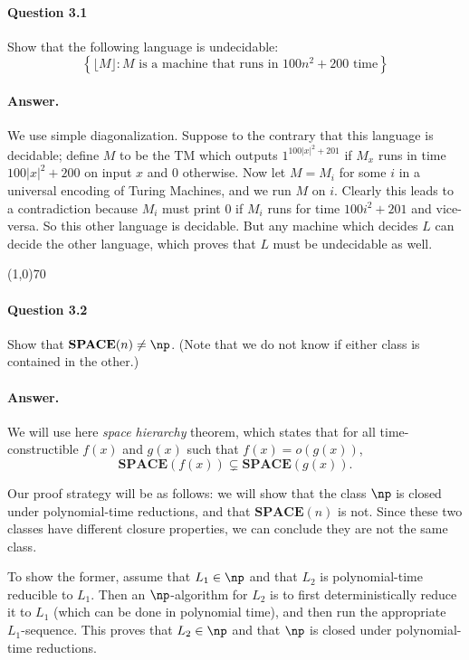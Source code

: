 \paragraph{Question 3.1} Show that the following language is undecidable:
\begin{equation*}
	\left\{\lfloor M\rfloor: M \text{ is a machine that runs in } 100n^2+200 \text{ time}\right\}
\end{equation*}
\paragraph{Answer.} We use simple diagonalization. Suppose to the contrary that this language is decidable; define $M$ to be the TM which outputs $1^{100|x|^2+201}$ if $M_x$ runs in time $100|x|^2+200$ on input $x$ and $0$ otherwise. Now let $M=M_i$ for some $i$ in a universal encoding of Turing Machines, and we run $M$ on $i$. Clearly this leads to a contradiction because $M_i$ must print $0$ if $M_i$ runs for time $100i^2+201$ and vice-versa. So this other language is decidable. But any machine which decides $L$ can decide the other language, which proves that $L$ must be undecidable as well.

\begin{center}
	\line(1,0){70}
\end{center}

\paragraph{Question 3.2} Show that $\mathbf{SPACE}(n)\neq\np$. (Note that we do not know if either class is contained in the other.)

\paragraph{Answer.} We will use here \textit{space hierarchy} theorem, which states that for all time-constructible $f(x)$ and $g(x)$ such that $f(x)=o(g(x))$, 
\begin{equation*}
	\mathbf{SPACE}(f(x))\subsetneq\mathbf{SPACE}(g(x)).
\end{equation*}

Our proof strategy will be as follows: we will show that the class $\np$ is closed under polynomial-time reductions, and that $\mathbf{SPACE}(n)$ is not. Since these two classes have different closure properties, we can conclude they are not the same class.

To show the former, assume that $L_1\in\np$ and that $L_2$ is polynomial-time reducible to $L_1$. Then an $\np$-algorithm for $L_2$ is to first deterministically reduce it to $L_1$ (which can be done in polynomial time), and then run the appropriate $L_1$-sequence. This proves that $L_2\in\np$ and that $\np$ is closed under polynomial-time reductions.

